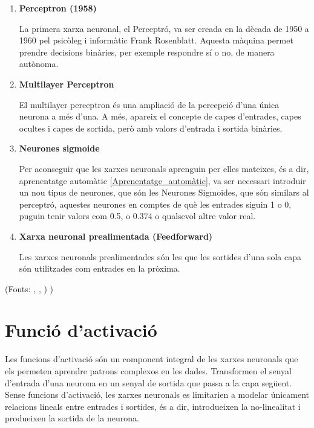 \begin{enumerate}
    \item \textbf{Perceptron (1958)}

    La primera xarxa neuronal, el Perceptró, va ser creada en la dècada de 1950 a 1960 pel psicòleg i informàtic Frank Rosenblatt. Aquesta màquina permet prendre decisions binàries, per exemple respondre sí o no, de manera autònoma.

    \item \textbf{Multilayer Perceptron}

    El multilayer perceptron és una ampliació de la percepció d'una única neurona a més d'una. A més, apareix el concepte de capes d'entrades, capes ocultes i capes de sortida, però amb valors d'entrada i sortida binàries.

    \item \textbf{Neurones sigmoide}

    Per aconseguir que les xarxes neuronals aprenguin per elles mateixes, és a dir, aprenentatge automàtic \ref{Aprenentatge_automàtic}, va ser necessari introduir un nou tipus de neurones, que són les Neurones Sigmoides, que són similars al perceptró, aquestes neurones en comptes de què les entrades siguin 1 o 0, puguin tenir valors com 0.5, o 0.374 o qualsevol altre valor real.

    \item \textbf{Xarxa neuronal prealimentada (Feedforward)}

    Les xarxes neuronals prealimentades són les que les sortides d'una sola capa són utilitzades com entrades en la pròxima.
\end{enumerate}
(Fonts: \cite{TreballFinalDeGrau}, \cite{Medium}, \cite{MediumSigmoid}) \cite{FeedForward})
\section{Funció d'activació}\label{Activació}

Les funcions d'activació són un component integral de les xarxes neuronals que els permeten aprendre patrons complexos en les dades. Transformen el senyal d'entrada d'una neurona en un senyal de sortida que passa a la capa següent. Sense funcions d'activació, les xarxes neuronals es limitarien a modelar únicament relacions lineals entre entrades i sortides, és a dir, introdueixen la no-linealitat i produeixen la sortida de la neurona.

